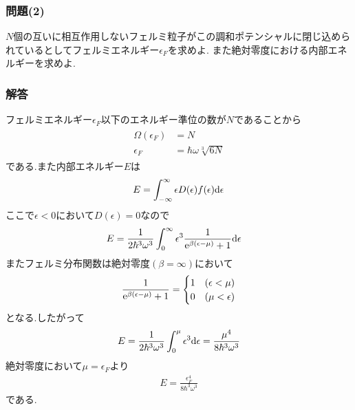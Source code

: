 \subsubsection*{問題(2)}
$N$個の互いに相互作用しないフェルミ粒子がこの調和ポテンシャルに閉じ込められているとしてフェルミエネルギー$\epsilon_F$を求めよ.
また絶対零度における内部エネルギーを求めよ.\\
\hrulefill
\subsubsection*{解答}
フェルミエネルギー$\epsilon_F$以下のエネルギー準位の数が$N$であることから
\begin{align}
  \begin{split}
    \Omega(\epsilon_F)&=N\\
    \epsilon_F&=\hbar\omega\sqrt[3]{6N}
  \end{split}
\end{align}
である.また内部エネルギー$E$は
\begin{align}
  \begin{split}
    E&=\int_{-\infty}^\infty\epsilon D(\epsilon) f(\epsilon){\rm d}\epsilon\\
  \end{split}
\end{align}
ここで$\epsilon<0$において$D(\epsilon)=0$なので
\begin{align}
  E&=\frac{1}{2\hbar^3\omega^3}\int_0^\infty\epsilon^3\frac{1}{{\rm e}^{\beta(\epsilon-\mu)}+1}{\rm d}\epsilon  
\end{align}
またフェルミ分布関数は絶対零度$(\beta=\infty)$において
\begin{align}
  \begin{split}
    \frac{1}{{\rm e}^{\beta(\epsilon-\mu)}+1}=
    \begin{cases}
      1&(\epsilon<\mu)\\
      0&(\mu<\epsilon)
    \end{cases}
  \end{split}
\end{align}
となる.したがって
\begin{align}
  E=\frac{1}{2\hbar^3\omega^3}\int_0^\mu\epsilon^3{\rm d}\epsilon=\frac{\mu^4}{8\hbar^3\omega^3}
\end{align}
絶対零度において$\mu=\epsilon_F$より
\begin{align}
  E=\frac{\epsilon_F^4}{8\hbar^3\omega^3}
\end{align}
である.
